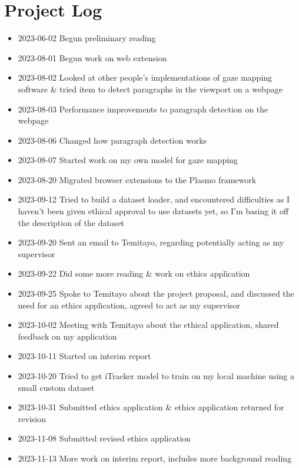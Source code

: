 \documentclass{report}
\begin{document}
\printbibliography

\appendix 

\chapter{Project Log}

\begin{itemize}
    \item 2023-06-02 Begun preliminary reading 
    \item 2023-08-01 Begun work on web extension 
    \item 2023-08-02 Looked at other people's implementations of gaze mapping software \& tried item to detect paragraphs in the viewport on a webpage 
    \item 2023-08-03 Performance improvements to paragraph detection on the webpage 
    \item 2023-08-06 Changed how paragraph detection works 
    \item 2023-08-07 Started work on my own model for gaze mapping 
    \item 2023-08-20 Migrated browser extensions to the Plasmo framework 
    \item 2023-09-12 Tried to build a dataset loader, and encountered difficulties as I haven't been given ethical approval to use datasets yet, so I'm basing it off the description of the dataset
    \item 2023-09-20 Sent an email to Temitayo, regarding potentially acting as my supervisor
    \item 2023-09-22 Did some more reading \& work on ethics application  
    \item 2023-09-25 Spoke to Temitayo about the project proposal, and discussed the need for an ethics application, agreed to act as my supervisor 
    \item 2023-10-02 Meeting with Temitayo about the ethical application, shared feedback on my application 
    \item 2023-10-11 Started on interim report 
    \item 2023-10-20 Tried to get iTracker model to train on my local machine using a small custom dataset 
    \item 2023-10-31 Submitted ethics application \& ethics application returned for revision
    \item 2023-11-08 Submitted revised ethics application 
    \item 2023-11-13 More work on interim report, includes more background reading 

\end{itemize}
\end{document}
